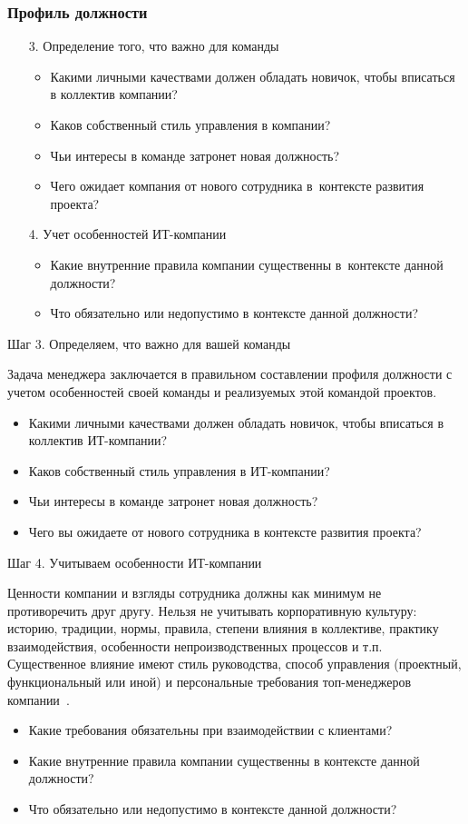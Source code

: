 \documentclass{../industrial-development}
\begin{document}
\begin{frame} \frametitle{Профиль должности}
	\begin{itemize}
		\item[3.] Определение того, что важно для команды
		\begin{itemize}
			\item Какими личными качествами должен обладать новичок, чтобы вписаться в коллектив компании?
			\item Каков собственный стиль управления в компании?
			\item Чьи интересы в команде затронет новая должность?
			\item	Чего ожидает компания от нового сотрудника в~контексте развития проекта?
			
		\end{itemize}
		
		\item[4.] Учет особенностей ИТ-компании
		\begin{itemize}
			\item Какие внутренние правила компании существенны в~контексте данной должности?
			\item Что обязательно или недопустимо в контексте данной должности?
		\end{itemize}
	\end{itemize}
\end{frame}

\lecturenotes

\alert{Шаг 3. Определяем, что важно для вашей команды}

Задача менеджера заключается в правильном составлении профиля должности с учетом особенностей своей команды и реализуемых этой командой проектов.
\begin{itemize}
	\item	Какими личными качествами должен обладать новичок, чтобы вписаться в коллектив ИТ-компании?
	\item	Каков собственный стиль управления в ИТ-компании?
	\item	Чьи интересы в команде затронет новая должность?
	\item	Чего вы ожидаете от нового сотрудника в контексте развития проекта?
\end{itemize}

\alert{Шаг 4. Учитываем особенности ИТ-компании}

Ценности компании и взгляды сотрудника должны как минимум не противоречить друг другу. Нельзя не учитывать корпоративную культуру: историю, традиции, нормы, правила, степени влияния в коллективе, практику взаимодействия, особенности непроизводственных процессов и т.п. Существенное влияние имеют стиль руководства, способ управления (проектный, функциональный или иной) и персональные требования топ-менеджеров компании~\cite[с.~280]{Pererva}.
\begin{itemize}
	\item	Какие требования обязательны при взаимодействии с клиентами?
	\item	Какие внутренние правила компании существенны в контексте данной должности?
	\item	Что обязательно или недопустимо в контексте данной должности?
\end{itemize}
\end{document}
